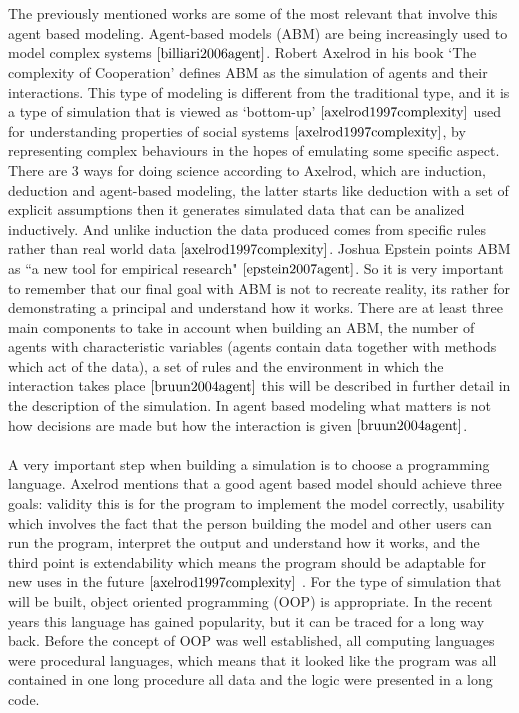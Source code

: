\documentclass{book}
\begin{document}
\\\\The previously mentioned works are some of the most relevant that involve this agent based modeling. Agent-based models (ABM) are being increasingly used to model complex systems $\cite{billiari2006agent}$. Robert Axelrod in his book `The complexity of Cooperation’ defines ABM as the simulation of agents and their interactions. This type of modeling is different from the traditional type, and it is a type of simulation that is viewed as `bottom-up’ $\cite{axelrod1997complexity}$ used for understanding properties of social systems $\cite{axelrod1997complexity}$, by representing complex behaviours in the hopes of emulating some specific aspect. There are 3 ways for doing science according to Axelrod, which are induction, deduction and agent-based modeling, the latter starts like deduction with a set of explicit assumptions then it generates simulated data that can be analized inductively. And unlike induction the data produced comes from specific rules rather than real world data $\cite{axelrod1997complexity}$. Joshua Epstein points ABM as ``a new tool for empirical research" $\cite{epstein2007agent}$. So it is very important to remember that our final goal with ABM is not to recreate reality, its rather for demonstrating a principal and understand how it works. 
There are at least three main components to take in account when building an ABM, the number of agents with characteristic variables (agents contain data together with methods which act of the data), a set of rules and the environment in which the interaction takes place $\cite{bruun2004agent}$ this will be described in further detail in the description of the simulation. In agent based modeling what matters is not how decisions are made but how the interaction is given $\cite{bruun2004agent}$. 
\\\\A very important step when building a simulation is to choose a programming language. Axelrod mentions that a good agent based model should achieve three goals: validity this is for the program to implement the model correctly, usability which involves the fact that the person building the model and other users can run the program, interpret the output and understand how it works, and the third point is extendability which means the program should be adaptable for new uses in the future $\cite{axelrod1997complexity}$ . For the type of simulation that will be built, object oriented programming (OOP) is appropriate. In the recent years this language has gained popularity, but it can be traced for a long way back. Before the concept of OOP was well established, all computing languages were procedural languages, which means that it looked like the program was all contained in one long procedure all data and the logic were presented in a long code.
\end{document}
